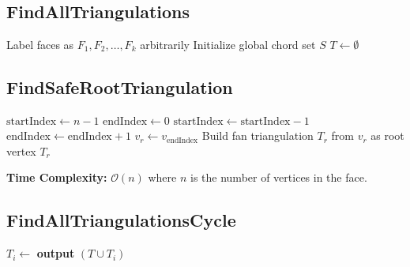 ﻿﻿\documentclass[12pt,a4paper]{article}
\theoremstyle{definition}
\theoremstyle{remark}
\begin{document}
\subsection*{FindAllTriangulations}
\begin{algorithm}[H]
	\caption{FindAllTriangulations}
	\begin{algorithmic}[1]
		\State Label faces as $F_1, F_2, \ldots, F_k$ arbitrarily
		\State Initialize global chord set $S$
		\State $T \gets \emptyset$ 
		\State {}
		\EndProcedure
	\end{algorithmic}
\end{algorithm}

\subsection*{FindSafeRootTriangulation}
\begin{algorithm}[H]
	\caption{FindSafeRootTriangulation}
	\begin{algorithmic}[1]
		\State $\text{startIndex} \gets n - 1$
		\State $\text{endIndex} \gets 0$
		\State $\text{startIndex} \gets \text{startIndex} - 1$
		\Else
		\State $\text{endIndex} \gets \text{endIndex} + 1$
		\EndIf
		\EndWhile
		\State $v_r \gets v_{\text{endIndex}}$ 
		\State Build fan triangulation $T_r$ from $v_r$ as root vertex
		\State \Return $T_r$
		\EndProcedure
	\end{algorithmic}
\end{algorithm}

\textbf{Time Complexity:} $\mathcal{O}(n)$ where $n$ is the number of vertices in the face.

\subsection*{FindAllTriangulationsCycle}
\begin{algorithm}[H]
	\caption{FindAllTriangulationsCycle}
	\begin{algorithmic}[1]
		\State $T_{i} \gets$  
		 
		\State \textbf{output} $(T \cup T_i)$
		\Else
		\State {}
		\EndIf
		\State {}
		\EndFor
		\EndProcedure
	\end{algorithmic}
\end{algorithm}
\end{document}
